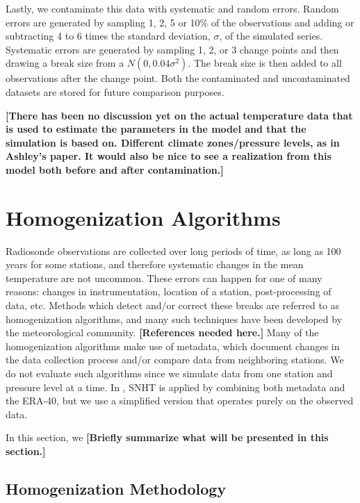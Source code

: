 \documentclass[12pt]{article}
\begin{document}
\begin{doublespacing}
Lastly, we contaminate this data with systematic and random errors.  Random errors are generated by sampling 1, 2, 5 or 10\% of the observations and adding or subtracting 4 to 6 times the standard deviation, $\sigma$, of the simulated series.  Systematic errors are generated by sampling 1, 2, or 3 change points and then drawing a break size from a $N(0,0.04 \sigma^2)$.  The break size is then added to all observations after the change point.  Both the contaminated and uncontaminated datasets are stored for future comparison purposes.

\textbf{[There has been no discussion yet on the actual temperature data that is used to estimate the parameters in the model and that the simulation is based on.  Different climate zones/pressure levels, as in Ashley's paper.  It would also be nice to see a realization  from this model both before and after contamination.]}











\section{Homogenization Algorithms}

Radiosonde observations are collected over long periods of time, as long as 100 years for some stations, and therefore  systematic changes in the mean temperature  are not uncommon.  These  errors can happen for one of many reasons: changes in instrumentation, location of a station, post-processing of data, etc.  Methods which detect and/or correct these breaks are referred to as homogenization algorithms, and many such techniques have been developed by the meteorological community. \textbf{[References needed here.]}   Many of the homogenization algorithms make use of metadata, which document changes in the data collection process and/or compare data from neighboring stations.  We do not evaluate such algorithms since we simulate data from one station and pressure level at a time.  In \cite{haimberger07}, SNHT is applied by combining both  metadata and the ERA-40, but we use a simplified version that operates purely on the observed data.

In this section, we \textbf{[Briefly summarize what will be presented in this section.]}

\subsection{Homogenization Methodology}


\end{doublespacing}
\end{document}
